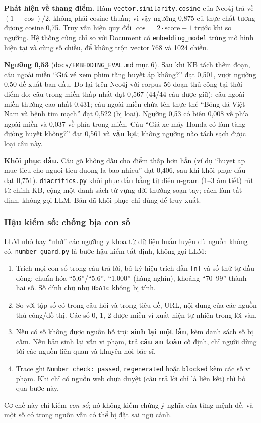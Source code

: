 \textbf{Phát hiện về thang điểm.} Hàm \texttt{vector.similarity.cosine} của Neo4j trả về $(1+\cos)/2$, không phải cosine thuần; vì vậy ngưỡng 0,875 cũ thực chất tương đương cosine 0,75. Truy vấn hiện quy đổi $\cos = 2\cdot\text{score}-1$ trước khi so ngưỡng. Hệ thống cũng chỉ so với Document có \texttt{embedding\_model} trùng mô hình hiện tại và cùng số chiều, để không trộn vector 768 và 1024 chiều.

\textbf{Ngưỡng 0,53} (\texttt{docs/EMBEDDING\_EVAL.md} mục 6). Sau khi KB tách thêm đoạn, câu ngoài miền “Giá vé xem phim tăng huyết áp không?” đạt 0,501, vượt ngưỡng 0,50 đề xuất ban đầu. Đo lại trên Neo4j với corpus 56 đoạn thủ công tại thời điểm đo: câu trong miền thấp nhất đạt 0,567 (44/44 câu được giữ); câu ngoài miền thường cao nhất 0,431; câu ngoài miền chứa tên thực thể “Bóng đá Việt Nam và bệnh tim mạch” đạt 0,522 (bị loại). Ngưỡng 0,53 có biên 0,008 về phía ngoài miền và 0,037 về phía trong miền. Câu “Giá xe máy Honda có làm tăng đường huyết không?” đạt 0,561 và \textbf{vẫn lọt}; không ngưỡng nào tách sạch được loại câu này.

\textbf{Khôi phục dấu.} Câu gõ không dấu cho điểm thấp hơn hẳn (ví dụ “huyet ap muc tieu cho nguoi tieu duong la bao nhieu” đạt 0,406, sau khi khôi phục dấu đạt 0,751). \texttt{diacritics.py} khôi phục dấu bằng từ điển n-gram (1--3 âm tiết) rút từ chính KB, cộng một danh sách từ vựng đời thường soạn tay; cách làm tất định, không gọi LLM. Bản đã khôi phục chỉ dùng để truy xuất.

\subsubsection{Hậu kiểm số: chống bịa con số}
LLM nhỏ hay “nhớ” các ngưỡng y khoa từ dữ liệu huấn luyện dù nguồn không có. \texttt{number\_guard.py} là bước hậu kiểm tất định, không gọi LLM:
\begin{enumerate}
\item Trích mọi con số trong câu trả lời, bỏ ký hiệu trích dẫn \texttt{[n]} và số thứ tự đầu dòng; chuẩn hóa “5,6”/“5.6”, “1.000” (hàng nghìn), khoảng “70--99” thành hai số. Số dính chữ như \texttt{HbA1c} không bị tính.
\item So với tập số có trong câu hỏi và trong tiêu đề, URL, nội dung của các nguồn thủ công/đồ thị. Các số 0, 1, 2 được miễn vì xuất hiện tự nhiên trong lời văn.
\item Nếu có số không được nguồn hỗ trợ: \textbf{sinh lại một lần}, kèm danh sách số bị cấm. Nếu bản sinh lại vẫn vi phạm, trả \textbf{câu an toàn} cố định, chỉ người dùng tới các nguồn liên quan và khuyên hỏi bác sĩ.
\item Trace ghi \texttt{Number check: passed}, \texttt{regenerated} hoặc \texttt{blocked} kèm các số vi phạm. Khi chỉ có nguồn web chưa duyệt (câu trả lời chỉ là liên kết) thì bỏ qua bước này.
\end{enumerate}
Cơ chế này chỉ kiểm \emph{con số}; nó không kiểm chứng ý nghĩa của từng mệnh đề, và một số có trong nguồn vẫn có thể bị đặt sai ngữ cảnh.
